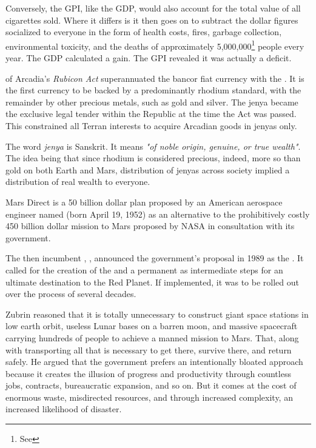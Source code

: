 Conversely, the GPI, like the GDP, would also account for the total value of all cigarettes sold. Where it differs is it then goes on to subtract the dollar figures socialized to everyone in the form of health costs, fires, garbage collection, environmental toxicity, and the deaths of approximately 5,000,000\footnote[]{See } people every year. The GDP calculated a gain. The GPI revealed it was actually a deficit.

{\sl {}} of Arcadia's {\sl Rubicon Act} superannuated the bancor fiat currency with the {\sl {}}. It is the first currency to be backed by a predominantly rhodium standard, with the remainder by other precious metals, such as gold and silver. The jenya became the exclusive legal tender within the Republic at the time the Act was passed. This constrained all Terran interests to acquire Arcadian goods in jenyas only.

The word {\sl jenya} is Sanskrit. It means {\sl "of noble origin, genuine, or true wealth"}. The idea being that since rhodium is considered precious, indeed, more so than gold on both Earth and Mars, distribution of jenyas across society implied a distribution of real wealth to everyone.

Mars Direct is a \type{$}50 billion dollar plan proposed by an American aerospace engineer named  (born April 19, 1952) as an alternative to the prohibitively costly \type{$}450 billion dollar mission to Mars proposed by NASA in consultation with its government.

The then incumbent , , announced the government's proposal in 1989 as the {\sl {}}. It called for the creation of the {\sl {}} and a permanent  as intermediate steps for an ultimate destination to the Red Planet. If implemented, it was to be rolled out over the process of several decades.

Zubrin reasoned that it is totally unnecessary to construct giant space stations in low earth orbit, useless Lunar bases on a barren moon, and massive spacecraft carrying hundreds of people to achieve a manned mission to Mars. That, along with transporting all that is necessary to get there, survive there, and return safely. He argued that the government prefers an intentionally bloated approach because it creates the illusion of progress and productivity through countless jobs, contracts, bureaucratic expansion, and so on. But it comes at the cost of enormous waste, misdirected resources, and through increased complexity, an increased likelihood of disaster.

